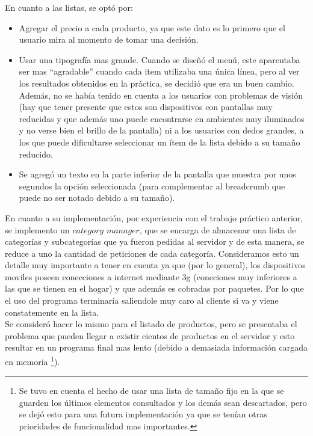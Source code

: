\documentclass[english]{article}
\begin{document}
En cuanto a las listas, se optó por: 
\begin{itemize}
\item Agregar el precio a cada producto, ya que este dato es lo primero
que el usuario mira al momento de tomar una decisión. 
\item Usar una tipografía mas grande. Cuando se diseñó el menú, este aparentaba
ser mas {}``agradable” cuando cada item utilizaba una única línea,
pero al ver los resultados obtenidos en la práctica, se decidió que
era un buen cambio. Además, no se había tenido en cuenta a los usuarios
con problemas de visión (hay que tener presente que estos son dispositivos
con pantallas muy reducidas y que además uno puede encontrarse en
ambientes muy iluminados y no verse bien el brillo de la pantalla)
ni a los usuarios con dedos grandes, a los que puede dificultarse
seleccionar un ítem de la lista debido a su tamaño reducido. 
\item Se agregó un texto en la parte inferior de la pantalla que muestra
por unos segundos la opción seleccionada (para complementar al breadcrumb
que puede no ser notado debido a su tamaño).\\

\end{itemize}
En cuanto a su implementación, por experiencia con el trabajo práctico
anterior, se implemento un \textquotedbl{}$category$ $manager$\textquotedbl{},
que se encarga de almacenar una lista de categorías y subcategorías
que ya fueron pedidas al servidor y de esta manera, se reduce a uno
la cantidad de peticiones de cada categoría. Consideramos esto un
detalle muy importante a tener en cuenta ya que (por lo general),
los dispositivos moviles poseen conecciones a internet mediante 3g
(coneciones muy inferiores a las que se tienen en el hogar) y que
además es cobradas por paquetes. Por lo que el uso del programa terminaría
saliendole muy caro al cliente si va y viene constatemente en la lista.\\
 Se consideró hacer lo mismo para el listado de productos, pero
se presentaba el problema que pueden llegar a existir cientos de productos
en el servidor y esto resultar en un programa final mas lento (debido
a demasiada información cargada en memoria%
\footnote{Se tuvo en cuenta el hecho de usar una lista de tamaño fijo en la
que se guarden los últimos elementos consultados y los demás sean
descartados, pero se dejó esto para una futura implementación ya que
se tenían otras prioridades de funcionalidad mas importantes.%
}).\\
 
\end{document}
